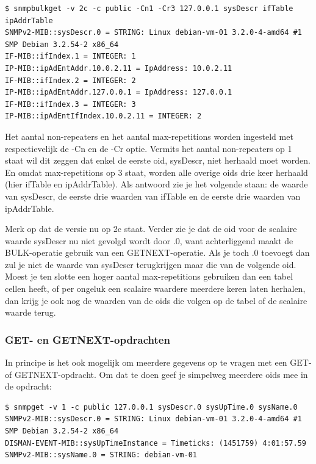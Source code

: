 \begin{lstlisting}[float=h, caption={SNMP BULK-opdracht}, label=netsnmp-bulk]
$ snmpbulkget -v 2c -c public -Cn1 -Cr3 127.0.0.1 sysDescr ifTable ipAddrTable
SNMPv2-MIB::sysDescr.0 = STRING: Linux debian-vm-01 3.2.0-4-amd64 #1 SMP Debian 3.2.54-2 x86_64
IF-MIB::ifIndex.1 = INTEGER: 1
IP-MIB::ipAdEntAddr.10.0.2.11 = IpAddress: 10.0.2.11
IF-MIB::ifIndex.2 = INTEGER: 2
IP-MIB::ipAdEntAddr.127.0.0.1 = IpAddress: 127.0.0.1
IF-MIB::ifIndex.3 = INTEGER: 3
IP-MIB::ipAdEntIfIndex.10.0.2.11 = INTEGER: 2
\end{lstlisting}

Het aantal non-repeaters en het aantal max-repetitions worden ingesteld met respectievelijk de -Cn en de -Cr optie.
Vermits het aantal non-repeaters op 1 staat wil dit zeggen dat enkel de eerste \gls{oid}, sysDescr, niet herhaald moet worden.
En omdat max-repetitions op 3 staat, worden alle overige \glspl{oid} drie keer herhaald (hier ifTable en ipAddrTable).
Als antwoord zie je het volgende staan: de waarde van sysDescr, de eerste drie waarden van ifTable en de eerste drie waarden van ipAddrTable.

Merk op dat de versie nu op 2c staat. Verder zie je dat de \gls{oid} voor de scalaire waarde sysDescr nu niet gevolgd wordt door .0,
want achterliggend maakt de BULK-operatie gebruik van een GETNEXT-operatie.
Als je toch .0 toevoegt dan zul je niet de waarde van sysDescr terugkrijgen maar die van de volgende \gls{oid}.
Moest je ten slotte een hoger aantal max-repetitions gebruiken dan een tabel cellen heeft,
of per ongeluk een scalaire waardere meerdere keren laten herhalen, dan krijg je ook nog de waarden van de \glspl{oid} die volgen op de tabel of de scalaire waarde terug.


\subsubsection{GET- en GETNEXT-opdrachten}
\label{meerdere-gegevens-ophalen-met-GET-en-GETNEXT}

In principe is het ook mogelijk om meerdere gegevens op te vragen met een GET- of GETNEXT-opdracht.
Om dat te doen geef je simpelweg meerdere \glspl{oid} mee in de opdracht:

\begin{lstlisting}[float=h, caption={Meerdere gegevens opvragen met SNMP GET}, label=netsnmp-get-meerdere]
$ snmpget -v 1 -c public 127.0.0.1 sysDescr.0 sysUpTime.0 sysName.0
SNMPv2-MIB::sysDescr.0 = STRING: Linux debian-vm-01 3.2.0-4-amd64 #1 SMP Debian 3.2.54-2 x86_64
DISMAN-EVENT-MIB::sysUpTimeInstance = Timeticks: (1451759) 4:01:57.59
SNMPv2-MIB::sysName.0 = STRING: debian-vm-01
\end{lstlisting}


